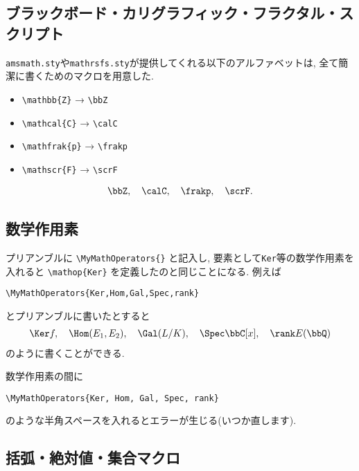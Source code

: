 \documentclass[
	paper=a4,
	fontsize=10pt, %
	jafontsize=12Q,
	jafontscale=0.92,
]{jlreq}
\begin{document}
\subsection{ブラックボード・カリグラフィック・フラクタル・スクリプト}

\texttt{amsmath.sty}や\texttt{mathrsfs.sty}が提供してくれる以下のアルファベットは, 全て簡潔に書くためのマクロを用意した.
\begin{itemize}
    \item \verb|\mathbb{Z}| → \verb|\bbZ|
    \item \verb|\mathcal{C}| → \verb|\calC|
    \item \verb|\mathfrak{p}| → \verb|\frakp|
    \item \verb|\mathscr{F}| → \verb|\scrF|
\end{itemize}

\begin{ex}{}{}
	\begin{align}
		\bbZ, \quad \calC, \quad \frakp, \quad \scrF.
	\end{align}
\end{ex}

\subsection{数学作用素}

プリアンブルに \verb|\MyMathOperators{}| と記入し, 要素として\texttt{Ker}等の数学作用素を入れると \verb|\mathop{Ker}| を定義したのと同じことになる.
例えば
\begin{center}
	\verb|\MyMathOperators{Ker,Hom,Gal,Spec,rank}|
\end{center}
とプリアンブルに書いたとすると
\begin{align}
	\Ker f, \quad \Hom(E_1, E_2), \quad \Gal(L/K), \quad \Spec \bbC[x], \quad \rank E(\bbQ)
\end{align}
のように書くことができる.

\begin{rem}{}{}
	数学作用素の間に
	\begin{center}
		\verb|\MyMathOperators{Ker, Hom, Gal, Spec, rank}|
	\end{center}
	のような半角スペースを入れるとエラーが生じる(いつか直します).
\end{rem}

\subsection{括弧・絶対値・集合マクロ}
\end{document}
